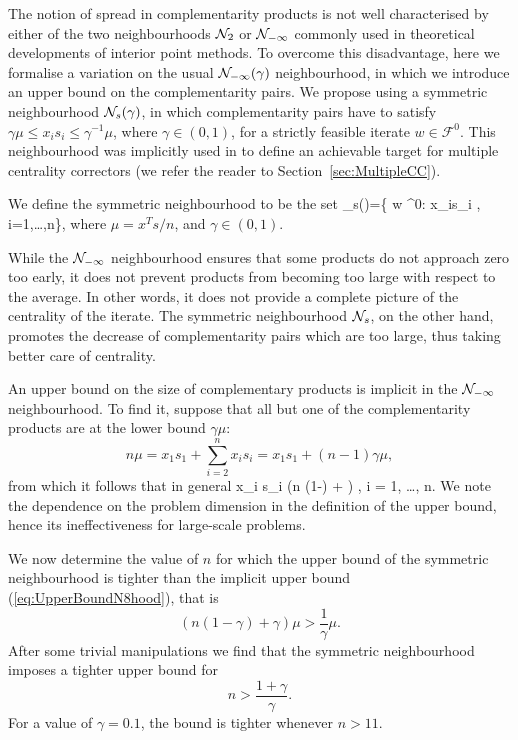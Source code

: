 The notion of spread in complementarity products
is not well characterised by either 
of the two neighbourhoods $\mathcal{N}_2$ or $\mathcal{N}_{-\infty}$ commonly used 
in theoretical developments of interior point methods.
To overcome this disadvantage, here we formalise a variation 
on the usual $\mathcal{N}_{-\infty}(\gamma)$ neighbourhood, 
in which we introduce an upper bound on the complementarity pairs. 
We propose using a symmetric neighbourhood $\mathcal{N}_s(\gamma)$,
in which complementarity pairs have to satisfy 
$\gamma \mu \leq x_i s_i \leq \gamma^{-1} \mu$, where $\gamma \in (0,1)$, 
for a strictly feasible iterate $w \in \mathcal{F}^0$.
This neighbourhood was implicitly used in \cite{Gondzio96}
to define an achievable target for multiple centrality correctors
(we refer the reader to Section~\ref{sec:MultipleCC}).


We define the symmetric neighbourhood to be the set
\be  \label{eq:SymmetricNeighbourhood}
  \Nhood_s(\gamma)=\{ w \in {}^0: 
  \gamma\mu\le x_is_i \le {}\mu, \; i=1,\ldots,n\},
\ee
where 
$\mu = x^Ts/n$, and $\gamma \in (0,1)$.

While the $\mathcal{N}_{-\infty}$ neighbourhood ensures that some 
products do not approach zero too early, it does not prevent products
from becoming too large with respect to the average.
In other words, it does not provide a complete 
picture of the centrality of the iterate. The symmetric 
neighbourhood $\mathcal{N}_s$, on the other hand, promotes 
the decrease of complementarity pairs which are too large, thus taking 
better care of centrality.

An upper bound on the size of complementary products
is implicit in the $\mathcal{N}_{-\infty}$ neighbourhood. To find it,
suppose that all but one of the complementarity products are at the lower bound
$\gamma\mu$:
\[
  n\mu = x_1s_1 + \sum_{i=2}^n x_is_i = x_1 s_1 + (n-1)\gamma\mu,
\]
from which it follows that in general
\be  \label{eq:UpperBoundN8hood}
  x_i s_i \le (n (1-\gamma) + \gamma) \mu, \quad i = 1, \ldots, n.
\ee
We note the dependence on the problem dimension in the definition of the
upper bound, hence its ineffectiveness for large-scale problems.

We now determine the value of $n$ for which the upper bound of
the symmetric neighbourhood is tighter than the implicit upper bound
(\ref{eq:UpperBoundN8hood}), that is
\[
  (n(1-\gamma) + \gamma)\mu > \frac{1}{\gamma}\mu.
\]
After some trivial manipulations we find that
the symmetric neighbourhood imposes a tighter upper bound
for
\[
  n > \frac{1+\gamma}{\gamma}.
\]
For a value of $\gamma = 0.1$, the bound is tighter whenever
$n > 11$.


